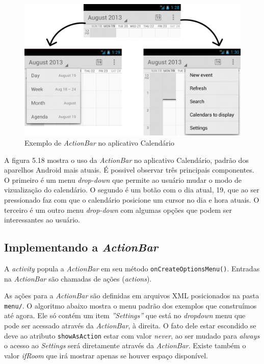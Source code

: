 \documentclass[a4paper,12pt,brazil]{book}
\begin{document}
\begin{singlespace}
	\begin{figure}[H]
	  \centering
	  \includegraphics[width=.8\textwidth]{figuras/design/actionbar-ex.jpg}
	  \caption{Exemplo de \emph{ActionBar} no aplicativo Calendário}
	  \label{fig:e}
	\end{figure}
	
	A figura 5.18 mostra o uso da \emph{ActionBar} no aplicativo Calendário, padrão dos aparelhos Android mais atuais. É possivel observar três principais componentes. O primeiro é um menu \emph{drop-down} que permite ao usuário mudar o modo de vizualização do calendário. O segundo é um botão com o dia atual, 19, que ao ser pressionado faz com que o calendário posicione um cursor no dia e hora atuais. O terceiro é um outro menu \emph{drop-down} com algumas opções que podem ser interessantes ao usuário.
	
	\subsection{Implementando a \emph{ActionBar}}
	
		A \emph{activity} popula a \emph{ActionBar} em seu método \texttt{onCreateOptionsMenu()}. Entradas na \emph{ActionBar} são chamadas de ações (\emph{actions}). 
		
		As ações para a \emph{ActionBar} são definidas em arquivos XML posicionados na pasta \texttt{menu/}. O algoritmo abaixo mostra o menu padrão dos exemplos que construímos até agora. Ele só contém um item \emph{''Settings''} que está no \emph{dropdown} menu que pode ser acessado através da \emph{ActionBar}, à direita. O fato dele estar escondido se deve ao atributo \texttt{showAsAction} estar com valor \emph{never}, ao ser mudado para \emph{always} o acesso ao \emph{Settings} será diretamente através da \emph{ActionBar}. Existe também o valor \emph{ifRoom} que irá mostrar apenas se houver espaço disponível.
		

\end{singlespace}
\end{document}

